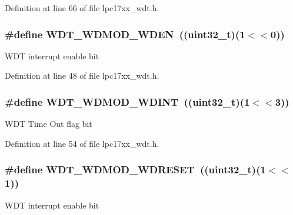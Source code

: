 \-Definition at line 66 of file lpc17xx\-\_\-wdt.\-h.

\hypertarget{group___w_d_t___private___macros_ga13c0108b9b798faa761d131a7caedaa6}{
\subsubsection[{\-W\-D\-T\-\_\-\-W\-D\-M\-O\-D\-\_\-\-W\-D\-E\-N}]{\setlength{\rightskip}{0pt plus 5cm}\#define {\bf \-W\-D\-T\-\_\-\-W\-D\-M\-O\-D\-\_\-\-W\-D\-E\-N}~((uint32\-\_\-t)(1$<$$<$0))}}\label{group___w_d_t___private___macros_ga13c0108b9b798faa761d131a7caedaa6}
\-W\-D\-T interrupt enable bit 

\-Definition at line 48 of file lpc17xx\-\_\-wdt.\-h.

\hypertarget{group___w_d_t___private___macros_gaa557a08bfcbbb1652f38b9433060ef61}{
\subsubsection[{\-W\-D\-T\-\_\-\-W\-D\-M\-O\-D\-\_\-\-W\-D\-I\-N\-T}]{\setlength{\rightskip}{0pt plus 5cm}\#define {\bf \-W\-D\-T\-\_\-\-W\-D\-M\-O\-D\-\_\-\-W\-D\-I\-N\-T}~((uint32\-\_\-t)(1$<$$<$3))}}\label{group___w_d_t___private___macros_gaa557a08bfcbbb1652f38b9433060ef61}
\-W\-D\-T \-Time \-Out flag bit 

\-Definition at line 54 of file lpc17xx\-\_\-wdt.\-h.

\hypertarget{group___w_d_t___private___macros_gaa24f93ca2d8ce2eaaa55c8973a8a5453}{
\subsubsection[{\-W\-D\-T\-\_\-\-W\-D\-M\-O\-D\-\_\-\-W\-D\-R\-E\-S\-E\-T}]{\setlength{\rightskip}{0pt plus 5cm}\#define {\bf \-W\-D\-T\-\_\-\-W\-D\-M\-O\-D\-\_\-\-W\-D\-R\-E\-S\-E\-T}~((uint32\-\_\-t)(1$<$$<$1))}}\label{group___w_d_t___private___macros_gaa24f93ca2d8ce2eaaa55c8973a8a5453}
\-W\-D\-T interrupt enable bit 

